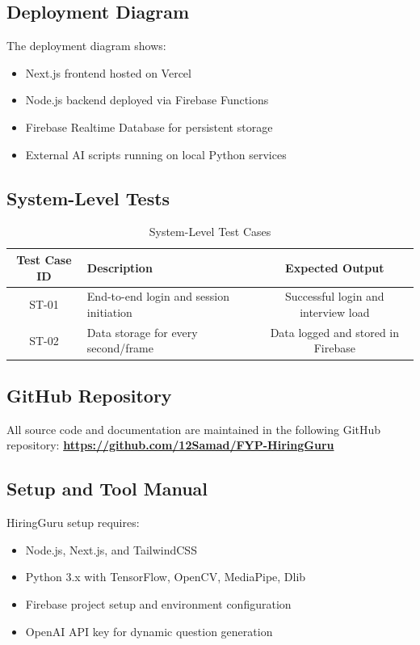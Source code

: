 \subsection{Deployment Diagram}
The deployment diagram shows:
\begin{itemize}
  \item Next.js frontend hosted on Vercel
  \item Node.js backend deployed via Firebase Functions
  \item Firebase Realtime Database for persistent storage
  \item External AI scripts running on local Python services
\end{itemize}

\subsection{System-Level Tests}
\begin{table}[!htbp]
\centering
\begin{tabular}{|c|p{8cm}|c|}
\hline
\textbf{Test Case ID} & \textbf{Description} & \textbf{Expected Output} \\
\hline
ST-01 & End-to-end login and session initiation & Successful login and interview load \\
\hline
ST-02 & Data storage for every second/frame & Data logged and stored in Firebase \\
\hline
\end{tabular}
\caption{System-Level Test Cases}
\label{tab:system-test-cases}
\end{table}

\subsection{GitHub Repository}
All source code and documentation are maintained in the following GitHub repository:  
\textbf{\url{https://github.com/12Samad/FYP-HiringGuru}}

\subsection{Setup and Tool Manual}
HiringGuru setup requires:
\begin{itemize}
  \item Node.js, Next.js, and TailwindCSS
  \item Python 3.x with TensorFlow, OpenCV, MediaPipe, Dlib
  \item Firebase project setup and environment configuration
  \item OpenAI API key for dynamic question generation
\end{itemize}

